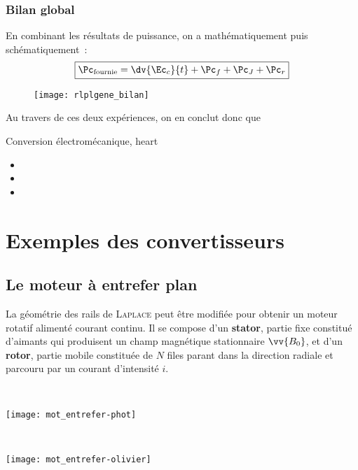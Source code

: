 \documentclass[../main/main.tex]{subfiles}
\begin{document}
\subsubsection{Bilan global}
\label{sssec:rlplgene_bilanglb}
En combinant les résultats de puissance, on a mathématiquement puis
schématiquement~:
\[
	\boxed{\Pc_{\rm fournie} = \dv{\Ec_c}{t} + \Pc_f + \Pc_J + \Pc_r}
\]
\begin{figure}[h!]
	\centering
	\texttt{[image: rlplgene\_bilan]}
	\label{fig:rlplgene_bilan}
\end{figure}

\newpage

Au travers de ces deux expériences, on en conclut donc que
\begin{tror}{Conversion électromécanique, heart}
	\begin{itemize}[label=$\diamond$, leftmargin=10pt]
		\item {}
		\item {}
		\item {}
	\end{itemize}
\end{tror}

\section{Exemples des convertisseurs}
\label{sec:exconv}
\subsection{Le moteur à entrefer plan}
\label{ssec:motentrefer}

La géométrie des rails de \textsc{Laplace} peut être modifiée pour obtenir un
moteur rotatif alimenté courant continu. Il se compose d'un \textbf{stator},
partie fixe constitué d'aimants qui produisent un champ magnétique stationnaire
$\vv{B_0}$, et d'un \textbf{rotor}, partie mobile constituée de $N$ files parant
dans la direction radiale et parcouru par un courant d'intensité $i$.
\smallbreak
\noindent
\hfill
\begin{minipage}[t]{.30\linewidth}
	~
	\begin{center}
		\texttt{[image: mot\_entrefer-phot]}
		\label{fig:motphoto}
	\end{center}
\end{minipage}
\hfill
\begin{minipage}[t]{.30\linewidth}
	~
	\begin{center}
		\texttt{[image: mot\_entrefer-olivier]}
		\label{fig:motolivier}
	\end{center}
\end{minipage}
\hfill~
\smallbreak
\end{document}
